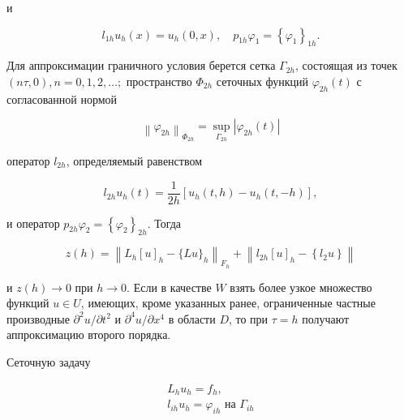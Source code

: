 \documentclass[10pt]{article}
\begin{document}
и



\[

l_{1 h} u_{h}(x)=u_{h}(0, x), \quad p_{1 h} \varphi_{1}=\left\{\varphi_{1}\right\}_{1 h} .

\]



Для аппроксимации граничного условия берется сетка $\Gamma_{2 h}$, состоящая из точек $(n \tau, 0), n=0,1,2, \ldots ;$ пространство $\Phi_{2 h}$ сеточных функций $\varphi_{2 h}(t)$ с согласованной нормой



\[

\left\|\varphi_{2 h}\right\|_{\Phi_{2 h}}=\sup _{\Gamma_{2 h}}\left|\varphi_{2 h}(t)\right|

\]



оператор $l_{2 h}$, определяемый равенством



\[

l_{2 h} u_{h}(t)=\frac{1}{2 h}\left[u_{h}(t, h)-u_{h}(t,-h)\right],

\]



и оператор $p_{2 h} \varphi_{2}=\left\{\varphi_{2}\right\}_{2 h}$. Тогда



\[

z(h)=\left\|L_{h}[u]_{h}-\{L u\}_{h}\right\|_{F_{h}}+\left\|l_{2 h}[u]_{h}-\left\{l_{2} u\right\}\right\|

\]



и $z(h) \rightarrow 0$ при $h \rightarrow 0$. Если в качестве $W$ взять более узкое множество функций $u \in U$, имеющих, кроме указанных ранее, ограниченные частные производные $\partial^{2} u / \partial t^{2}$ и $\partial^{4} u / \partial x^{4}$ в области $D$, то при $\tau=h$ получают аппроксимацию второго порядка.



Сеточную задачу



\[

\begin{gathered}

L_{h} u_{h}=f_{h}, \\

l_{i h} u_{h}=\varphi_{i h} \text { на } \Gamma_{i h}

\end{gathered}

\]
\end{document}
